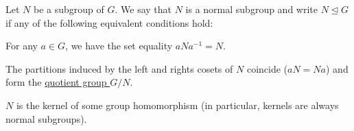 \begin{definition}\label{def:normal_subgroup}
  Let $N$ be a subgroup of $G$. We say that $N$ is a normal subgroup and write $N \unlhd G$ if any of the following equivalent conditions hold:
  \begin{defenum}
    \item\label{def:normal_subgroup/direct} For any $a \in G$, we have the set equality $a N a^{-1} = N$.
    \item\label{def:normal_subgroup/cosets} The partitions induced by the left and rights cosets of $N$ coincide ($aN = Na$) and form the \uline{quotient group $G / N$}.
    \item\label{def:normal_subgroup/kernel} $N$ is the kernel of some group homomorphism (in particular, kernels are always normal subgroups).
  \end{defenum}
\end{definition}
